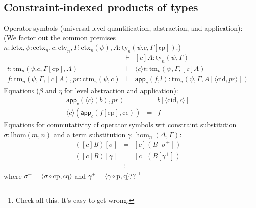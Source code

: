 \documentclass[11pt,a4paper]{article}
\theoremstyle{definition}
\newcommand{\app}[2]{{#1\,#2}} %
\def\lhom{\mathrm{lhom}}
\def\lctx{\mathrm{lctx}}
\def\cctx{\mathrm{cctx}}
\def\cty{\mathrm{cty}}
\def\ctm{\mathrm{ctm}}
\def\cid{\mathrm{cid}}
\def\cp{\mathrm{cp}}
\def\cq{\mathrm{cq}}
\newcommand{\ctx}{\mathrm{ctx}}
\newcommand{\ty}{\mathrm{ty}}
\newcommand{\tm}{\mathrm{tm}}
\newcommand{\tuple}[1]{\langle #1 \rangle}
\def\p{\mathrm{p}}
\def\q{\mathrm{q}}
\def\app{\mathsf{app}}
\begin{document}
\subsection{Constraint-indexed products of types}
\def\l{\mathrm{l}}
Operator symbols (universal level quantification, abstraction, and application):
(We  factor out the common premises 
$
n : \lctx, \psi : \cctx_n, c : \cty_n, \Gamma : \ctx_n(\psi), A : \ty_n(\psi.c, \Gamma[\cp])
$.)
\begin{eqnarray*}
&\vdash& [c]A : \ty_n(\psi,\Gamma)\\
t : \tm_n(\psi.c,\Gamma[\cp], A) 
&\vdash& \langle c \rangle t : \tm_n(\psi,\Gamma,[c]A)\\
f :  \tm_n(\psi,\Gamma,[c]A), pr : \ctm_n(\psi,c) &\vdash& \app_c(f,l) : \tm_n(\psi,\Gamma, A[\tuple{\cid,pr}])
\end{eqnarray*}
Equations ($\beta$ and $\eta$ for level abstraction and application):
 \begin{eqnarray*}
 \app_c(\langle c \rangle(b),pr) &=& b[\tuple{\cid,c}]\\
 \langle c \rangle(\app_c(f[\cp],\cq)) &=& f
 \end{eqnarray*}
 Equations for commutativity of operator symbols wrt constraint substitution $\sigma : \lhom(m,n)$ and a term substitution $\gamma : \hom_n(\Delta,\Gamma)$:
 \begin{eqnarray*}
 ([c]B)[ \sigma ] &=& [c](B[ \sigma^{+}])\\
 ([c]B)[ \gamma ] &=& [c](B[ \gamma^+ ])\\
&\vdots&
\end{eqnarray*}
where $\sigma^+ = \tuple{\sigma \circ \cp, \cq}$ and $\gamma^+ = \tuple{\gamma \circ \p, \q}$??
\footnote{Check all this. It's easy to get wrong.}
\end{document}
